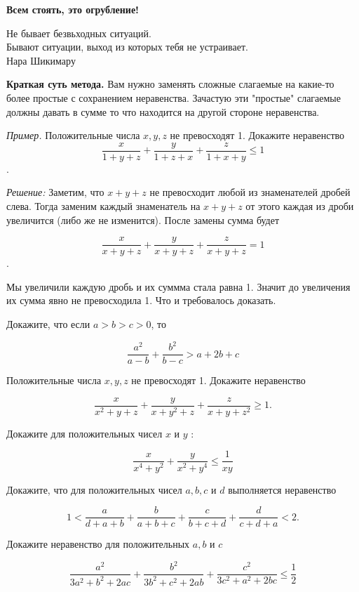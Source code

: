\centerline{\bf \Huge Всем стоять, это огрубление!}

\begin{flushright}
        \scriptsize{Не бывает безвьходных ситуаций.\\ Бывают ситуации, выход из которых тебя не устраивает.\\Нара Шикимару}
\end{flushright}


\textbf{Краткая суть метода.} Вам нужно заменять сложные слагаемые на какие-то более простые с сохранением неравенства. Зачастую эти "простые" слагаемые должны давать в сумме то что находится на другой стороне неравенства. 

\textit{Пример.} Положительные числа $x, y, z$ не превосходят 1. Докажите неравенство $$\frac{x}{1+y+z}+\frac{y}{1+z+x}+\frac{z}{1+x+y} \leqslant 1$$.

\textit{Решение:} Заметим, что $x+y+z$ не превосходит любой из знаменателей дробей слева. Тогда заменим каждый знаменатель на $x+y+z$ от этого каждая из дроби увеличится (либо же не изменится). После замены сумма будет 

$$\frac{x}{x+y+z}+\frac{y}{x+y+z}+\frac{z}{x+y+z} = 1$$.

Мы увеличили каждую дробь и их суммма стала равна 1. Значит до увеличения их сумма явно не превосходила 1. Что и требовалось доказать.

Докажите, что если $a>b>c>0$, то

$$
\frac{a^2}{a-b}+\frac{b^2}{b-c}>a+2 b+c
$$

Положительные числа $x, y, z$ не превосходят 1. Докажите неравенство

$$
\frac{x}{x^2+y+z}+\frac{y}{x+y^2+z}+\frac{z}{x+y+z^2} \geqslant 1 .
$$

Докажите для положительных чисел $x$ и $y$ :

$$
\frac{x}{x^4+y^2}+\frac{y}{x^2+y^4} \leqslant \frac{1}{x y}
$$

\newpage

\hspace{3mm}


Докажите, что для положительных чисел $a, b, c$ и $d$ выполняется неравенство

$$
1<\frac{a}{d+a+b}+\frac{b}{a+b+c}+\frac{c}{b+c+d}+\frac{d}{c+d+a}<2 .
$$

Докажите неравенство для положительных $a, b$ и $c$

$$
\frac{a^2}{3 a^2+b^2+2 a c}+\frac{b^2}{3 b^2+c^2+2 a b}+\frac{c^2}{3 c^2+a^2+2 b c} \leqslant \frac{1}{2}
$$